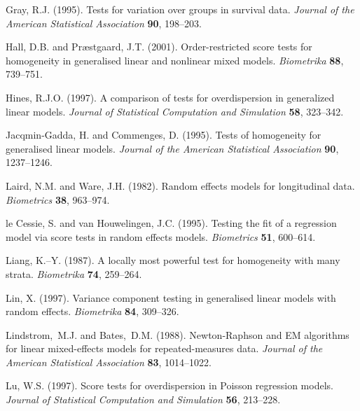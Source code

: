 \documentclass[useAMS,usenatbib,referee]{biom}
\begin{document}
\begin{thebibliography}{}
Gray, R.J. (1995).
Tests for variation over groups in survival data.
{\em Journal of the American Statistical Association} {\bfseries 90}, 198--203.

Hall, D.B. and Pr{\ae}stgaard, J.T. (2001).
Order-restricted score tests for homogeneity in generalised linear and nonlinear mixed models.
{\em Biometrika} {\bfseries 88}, 739--751.

Hines, R.J.O. (1997).
A comparison of tests for overdispersion in generalized linear models.
{\em Journal of Statistical Computation and Simulation} {\bfseries 58}, 323--342.

Jacqmin-Gadda, H. and Commenges, D. (1995).
Tests of homogeneity for generalised linear models.
{\em Journal of the American Statistical Association} {\bfseries 90}, 1237--1246.

Laird, N.M. and Ware, J.H. (1982).
Random effects models for longitudinal data.
{\em Biometrics} {\bfseries 38}, 963--974.

le Cessie, S. and van Houwelingen, J.C. (1995).
Testing the fit of a regression model via score tests in random effects models.
{\em Biometrics} {\bfseries 51}, 600--614.


Liang, K.--Y. (1987).
A locally most powerful test for homogeneity with many strata.
{\em Biometrika} {\bfseries 74}, 259--264.

Lin, X. (1997).
Variance component testing in generalised linear models with random effects.
{\em Biometrika} {\bfseries 84}, 309--326.

Lindstrom,~M.J. and Bates,~D.M. (1988).
 Newton-{R}aphson and {EM} algorithms for linear mixed-effects models for
  repeated-measures data.
{\em Journal of the American Statistical Association} {\bf 83}, 1014--1022.

Lu, W.S. (1997).
Score tests for overdispersion in Poisson regression models.
{\em Journal of Statistical Computation and Simulation} {\bfseries 56}, 213--228.


\end{thebibliography}
\end{document}
